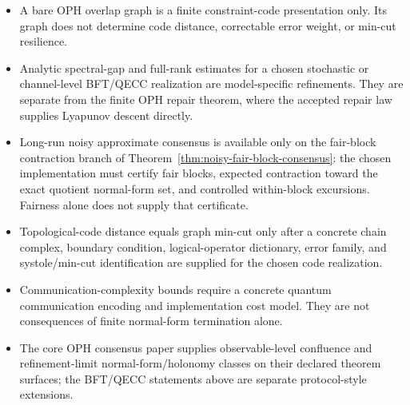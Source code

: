\begin{itemize}
  \item A bare OPH overlap graph is a finite constraint-code presentation only. Its graph does
        not determine code distance, correctable error weight, or min-cut resilience.
  \item Analytic spectral-gap and full-rank estimates for a chosen stochastic or channel-level
        BFT/QECC realization are model-specific refinements. They are separate from the finite
        OPH repair theorem, where the accepted repair law supplies Lyapunov descent directly.
  \item Long-run noisy approximate consensus is available only on the fair-block contraction
        branch of Theorem~\ref{thm:noisy-fair-block-consensus}: the chosen implementation must
        certify fair blocks, expected contraction toward the exact quotient normal-form set, and
        controlled within-block excursions. Fairness alone does not supply that certificate.
  \item Topological-code distance equals graph min-cut only after a concrete chain complex,
        boundary condition, logical-operator dictionary, error family, and systole/min-cut
        identification are supplied for the chosen code realization.
  \item Communication-complexity bounds require a concrete quantum communication encoding and
        implementation cost model. They are not consequences of finite normal-form termination
        alone.
  \item The core OPH consensus paper supplies observable-level confluence and refinement-limit
        normal-form/holonomy classes on their declared theorem surfaces; the BFT/QECC statements
        above are separate protocol-style extensions.
\end{itemize}

